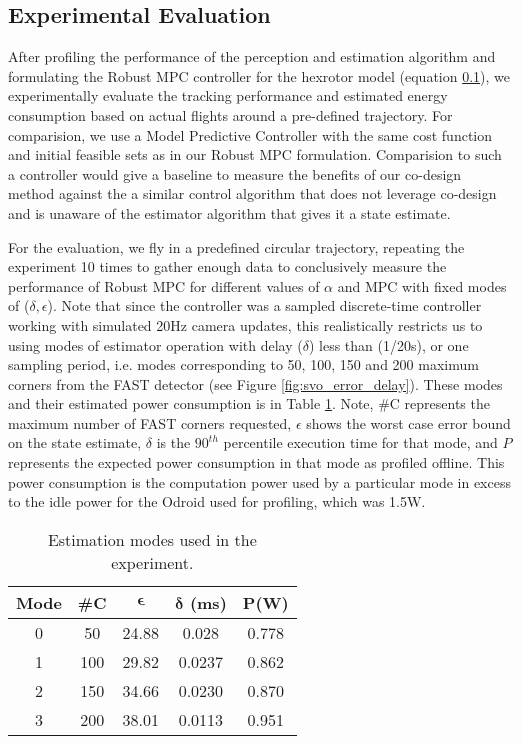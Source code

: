 \subsection{Experimental Evaluation}

After profiling the performance of the perception and estimation algorithm and formulating the Robust MPC controller for the hexrotor model (equation \ref{}), we experimentally evaluate the tracking performance and estimated energy consumption based on actual flights around a pre-defined trajectory. For comparision, we use a Model Predictive Controller with the same cost function and initial feasible sets as in our Robust MPC formulation. Comparision to such a controller would give a baseline to measure the benefits of our co-design method against the a similar control algorithm that does not leverage co-design and is unaware of the estimator algorithm that gives it a state estimate. 

For the evaluation, we fly in a predefined circular trajectory, repeating the experiment 10 times to gather enough data to conclusively measure the performance of Robust MPC for different values of $\alpha$ and MPC with fixed modes of ($\delta,\epsilon$). Note that since the controller was a sampled discrete-time controller working with simulated 20Hz camera updates, this realistically restricts us to using modes of estimator operation with delay ($\delta$) less than (1/20s), or one sampling period, i.e. modes corresponding to 50, 100, 150 and 200 maximum corners from the  FAST detector (see Figure \ref{fig:svo_error_delay}). These modes and their estimated power consumption is in Table \ref{tbl:modes_exp}. Note, \#C represents the maximum number of FAST corners requested, $\epsilon$ shows the worst case error bound on the state estimate, $\delta$ is the $90^{th}$ percentile execution time for that mode, and $P$ represents the expected power consumption in that mode as profiled offline. This power consumption is the computation power used by a particular mode in excess to the idle power for the Odroid used for profiling, which was 1.5W.

\begin{table}[htb]
\begin{center}
\caption{Estimation modes used in the experiment.}
\label{tbl:modes_exp}
\begin{tabular} {|c|c|c|c|c|}
	\hline
	\textbf{Mode} & \textbf{\#C} & $\pmb{\epsilon}$ & $\pmb{\delta}$ \textbf{(ms)} & $\pmb{P}$\textbf{(W)} \\ \hline
	0 & 50 &  24.88 & 0.028 &  0.778  \\ \hline
 	1 & 100 & 29.82 & 0.0237 &  0.862  \\ \hline
	2 & 150 & 34.66 & 0.0230 & 0.870 \\ \hline
	3 & 200 & 38.01 & 0.0113 & 0.951 \\ \hline
	\end{tabular}	
	\end{center}
\end{table}



